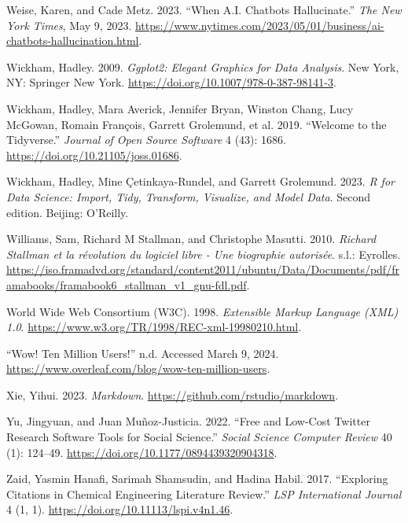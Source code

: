 \documentclass[
  letterpaper,
]{scrbook}
\newlength{\cslhangindent}
\newlength{\cslentryspacingunit} %
\newenvironment{CSLReferences}[2] %
 {%
  \setlength{\parindent}{0pt}
  \ifodd #1
  \let\oldpar\par
  \def\par{\hangindent=\cslhangindent\oldpar}
  \fi
  \setlength{\parskip}{#2\cslentryspacingunit}
 }%
 {}
\begin{document}
\begin{CSLReferences}{1}{0}
\leavevmode{}%
Weise, Karen, and Cade Metz. 2023. {``When {A}.{I}. {Chatbots
Hallucinate}.''} \emph{The New York Times}, May 9, 2023.
\url{https://www.nytimes.com/2023/05/01/business/ai-chatbots-hallucination.html}.

\leavevmode{}%
Wickham, Hadley. 2009. \emph{Ggplot2: {Elegant Graphics} for {Data
Analysis}}. New York, NY: Springer New York.
\url{https://doi.org/10.1007/978-0-387-98141-3}.

\leavevmode{}%
Wickham, Hadley, Mara Averick, Jennifer Bryan, Winston Chang, Lucy
McGowan, Romain François, Garrett Grolemund, et al. 2019. {``Welcome to
the {Tidyverse}.''} \emph{Journal of Open Source Software} 4 (43): 1686.
\url{https://doi.org/10.21105/joss.01686}.

\leavevmode{}%
Wickham, Hadley, Mine Çetinkaya-Rundel, and Garrett Grolemund. 2023.
\emph{R for Data Science: Import, Tidy, Transform, Visualize, and Model
Data}. Second edition. Beijing: O'Reilly.

\leavevmode{}%
Williams, Sam, Richard M Stallman, and Christophe Masutti. 2010.
\emph{Richard Stallman et la révolution du logiciel libre - Une
biographie autorisée}. s.l.: Eyrolles.
\url{https://iso.framadvd.org/standard/content2011/ubuntu/Data/Documents/pdf/framabooks/framabook6_stallman_v1_gnu-fdl.pdf}.

\leavevmode{}%
World Wide Web Consortium (W3C). 1998. \emph{Extensible {Markup
Language} ({XML}) 1.0}.
\url{https://www.w3.org/TR/1998/REC-xml-19980210.html}.

\leavevmode{}%
{``Wow! {Ten} Million Users!''} n.d. Accessed March 9, 2024.
\url{https://www.overleaf.com/blog/wow-ten-million-users}.

\leavevmode{}%
Xie, Yihui. 2023. \emph{Markdown}.
\url{https://github.com/rstudio/markdown}.

\leavevmode{}%
Yu, Jingyuan, and Juan Muñoz-Justicia. 2022. {``Free and {Low-Cost
Twitter Research Software Tools} for {Social Science}.''} \emph{Social
Science Computer Review} 40 (1): 124--49.
\url{https://doi.org/10.1177/0894439320904318}.

\leavevmode{}%
Zaid, Yasmin Hanafi, Sarimah Shamsudin, and Hadina Habil. 2017.
{``Exploring {Citations} in {Chemical Engineering Literature Review}.''}
\emph{LSP International Journal} 4 (1, 1).
\url{https://doi.org/10.11113/lspi.v4n1.46}.

\end{CSLReferences}


\backmatter
\end{document}
